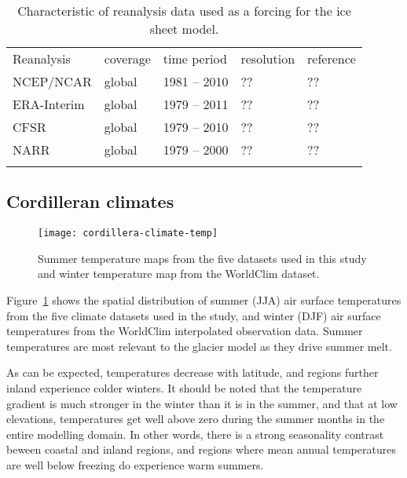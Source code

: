 \begin{table}[t]
	\caption{Characteristic of reanalysis data used as a forcing for the ice sheet model.}
	\label{tab:reanalyses}
	\vskip4mm
	\centering
	\begin{tabular}{lllll}
		\tophline
		Reanalysis& coverage& time period&  resolution& reference\\
		\middlehline
		NCEP/NCAR&  global&   1981 -- 2010& ??& ??\\
		ERA-Interim&global&   1979 -- 2011& ??& ??\\
		CFSR&       global&   1979 -- 2010& ??& ??\\
		NARR&       global&   1979 -- 2000& ??& ??\\
		\bottomhline
	\end{tabular}
\end{table}


\subsection{Cordilleran climates}

\begin{figure}[t]
	\vspace*{2mm}
	\begin{center}
		\texttt{[image: cordillera-climate-temp]}
	\end{center}
	\caption{Summer temperature maps from the five datasets used in this study and winter temperature map from the WorldClim dataset.}
	\label{fig:temp}
\end{figure}

Figure~\ref{fig:temp} shows the spatial distribution of summer (JJA) air surface temperatures from the five climate datasets used in the study, and winter (DJF) air surface temperatures from the WorldClim interpolated observation data. Summer temperatures are most relevant to the glacier model as they drive summer melt.

As can be expected, temperatures decrease with latitude, and regions further inland experience colder winters. It should be noted that the temperature gradient is much stronger in the winter than it is in the summer, and that at low elevations, temperatures get well above zero during the summer months in the entire modelling domain. In other words, there is a strong seasonality contrast beween coastal and inland regions, and regions where mean annual temperatures are well below freezing do experience warm summers.

